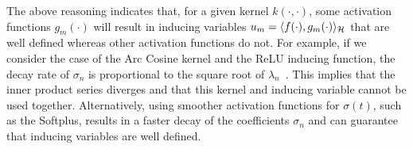 
The above reasoning indicates that, for a given kernel $k(\cdot, \cdot)$, some activation functions $g_m(\cdot)$ will result in inducing variables $u_m = \langle f(\cdot), g_m(\cdot) \rangle_{{\mathcal{H}}}$ that are well defined whereas other activation functions do not. For example, if we consider the case of the Arc Cosine kernel and the ReLU inducing function, the decay rate of $\sigma_n$ is proportional to the square root of $\lambda_n$~\citep{bach2017breaking,bietti2020deep}. This implies that the inner product series diverges and that this kernel and inducing variable cannot be used together. Alternatively, using smoother activation functions for $\sigma(t)$, such as the Softplus, results in a faster decay of the coefficients $\sigma_n$ and can guarantee that inducing variables are well defined.

